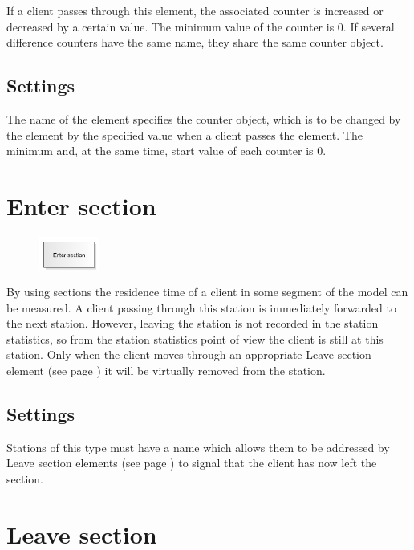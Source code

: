 If a client passes through this element, the associated counter is increased or decreased by a certain value.
The minimum value of the counter is 0. If several difference counters have the same name, they share the same
counter object.

\subsection*{Settings}

The name of the element specifies the counter object, which is to be changed by the element by the specified value
when a client passes the element. The minimum and, at the same time, start value of each counter is 0.


\section{Enter section}
\label{ref:ModelElementSectionStart}

\begin{figure}
\vspace{-22pt}
\includegraphics[width=2cm]{imageModelElementSectionStart.png}
\vspace{-22pt}
\end{figure}

By using sections the residence time of a client in some segment of the model can be measured.
A client passing through this station is immediately forwarded to the next station.
However, leaving the station is not recorded in the station statistics, so from the station
statistics point of view the client is still at this station. Only when the client moves through
an appropriate Leave section element (see page \pageref{ref:ModelElementSectionEnd}) it will be
virtually removed from the station.

\subsection*{Settings}

Stations of this type must have a name which allows them to be addressed by
Leave section elements (see page \pageref{ref:ModelElementSectionEnd}) to signal
that the client has now left the section.


\section{Leave section}
\label{ref:ModelElementSectionEnd}

